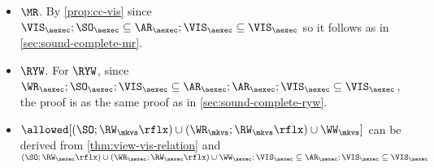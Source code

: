 \begin{itemize}
    \item \( \MR \).  By \cref{prop:cc-vis} since 
    \( \VIS_\aexec ; \SO_\aexec \subseteq \AR_\aexec ; \VIS_\aexec \subseteq \VIS_\aexec \)
    so it follows as in \cref{sec:sound-complete-mr}.
    \item \( \RYW \). For \( \RYW \), since \( \WR_\aexec ; \SO_\aexec ; \VIS_\aexec \subseteq \AR_\aexec ; \AR_\aexec ; \VIS_\aexec \subseteq \VIS_\aexec\), 
    the proof is as the same proof as in \cref{sec:sound-complete-ryw}.

\item \( \allowed[(\SO ; \RW_{\mkvs}\rflx) \cup (\WR_{\mkvs} ; \RW_{\mkvs}\rflx) \cup \WW_\mkvs] \) can be derived 
    from \cref{thm:view-vis-relation} and \( (\SO ; \RW_{\aexec}\rflx) \cup (\WR_{\aexec} ; \RW_{\aexec}\rflx) \cup \WW_\aexec ; \VIS_\aexec \subseteq \AR_\aexec ; \VIS_\aexec \subseteq \VIS_\aexec\)
\end{itemize}
